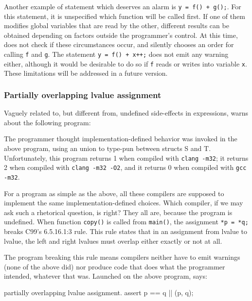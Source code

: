 \documentclass{frama-c-book}
\newcommand{\isoc}{\textsf{C99}}
\begin{document}
Another example of statement which deserves an alarm
is \lstinline|y = f() + g();|. For this statement, it is
unspecified which function will be called first.  If one of them
modifies global variables that are read by the other, different
results can be obtained depending on factors outside the programmer's
control. At this time, \Eva{} does not check if these
circumstances occur, and silently chooses an order for calling
\lstinline|f| and \lstinline|g|. The statement
\lstinline|y = f() + x++;|
does not emit any warning either, although it would be desirable
to do so if \lstinline|f| reads or writes into variable \lstinline|x|.
These limitations will be addressed in a future version.

\subsubsection{Partially overlapping lvalue assignment}

Vaguely related to, but different from, undefined side-effects in expressions,
\Eva{} warns about the following program:


The programmer thought implementation-defined behavior was invoked
in the above program, using an union to type-pun between structs S and T.
Unfortunately, this program returns 1 when compiled
with \lstinline|clang -m32|; it returns 2 when compiled
with \lstinline|clang -m32 -O2|,
and it returns 0 when compiled with \lstinline|gcc -m32|.

For a
program as simple as the above, all these compilers are
supposed to implement the same implementation-defined choices. Which
compiler, if we may ask such a rhetorical
question, is right? They all are, because the program is undefined.
When function \lstinline|copy()| is called from \lstinline|main()|,
the assignment \lstinline|*p = *q;| breaks
\isoc{}'s 6.5.16.1:3 rule. This rule states that
in an assignment from lvalue to lvalue,
the left and right lvalues must overlap either exactly or not at all.

The program breaking this rule means compilers neither have to emit
warnings (none of the above did) nor produce code that does what the
programmer intended, whatever that was.
Launched on the above program, \Eva{} says:
\begin{logsmath}
partially overlapping lvalue assignment. assert p == q || \separated(p, q);
\end{logsmath}
\end{document}
